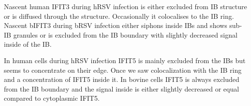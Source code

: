Nascent human IFIT3 during hRSV infection is either excluded from IB structure or is diffused through the structure. Occasionally it colocalises to the IB ring. Nascent bIFIT3 during bRSV infection either siphons inside IBs and shows sub-IB granules or is excluded from the IB boundary with slightly decreased signal inside of the IB.

In human cells during hRSV infection IFIT5 is mainly excluded from the IBs but seems to concentrate on their edge. Once we saw colocalization with the IB ring and a concentration of IFIT5 inside it. In bovine cells IFIT5 is always excluded from the IB boundary and the signal inside is either slightly decreased or equal compared to cytoplasmic IFIT5. 
